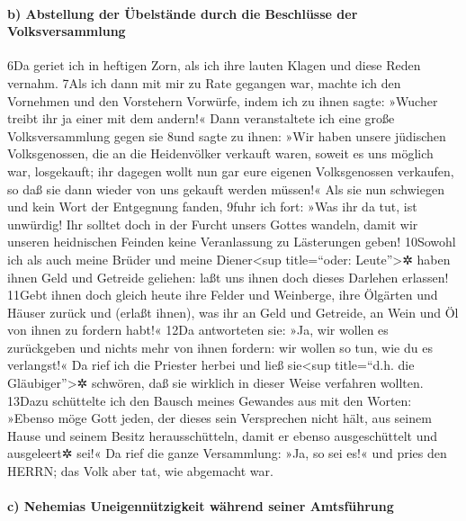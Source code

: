 \hypertarget{b-abstellung-der-uxfcbelstuxe4nde-durch-die-beschluxfcsse-der-volksversammlung}{%
\paragraph{b) Abstellung der Übelstände durch die Beschlüsse der
Volksversammlung}\label{b-abstellung-der-uxfcbelstuxe4nde-durch-die-beschluxfcsse-der-volksversammlung}}

6Da geriet ich in heftigen Zorn, als ich ihre lauten Klagen und diese
Reden vernahm. 7Als ich dann mit mir zu Rate gegangen war, machte ich
den Vornehmen und den Vorstehern Vorwürfe, indem ich zu ihnen sagte:
»Wucher treibt ihr ja einer mit dem andern!« Dann veranstaltete ich eine
große Volksversammlung gegen sie 8und sagte zu ihnen: »Wir haben unsere
jüdischen Volksgenossen, die an die Heidenvölker verkauft waren, soweit
es uns möglich war, losgekauft; ihr dagegen wollt nun gar eure eigenen
Volksgenossen verkaufen, so daß sie dann wieder von uns gekauft werden
müssen!« Als sie nun schwiegen und kein Wort der Entgegnung fanden,
9fuhr ich fort: »Was ihr da tut, ist unwürdig! Ihr solltet doch in der
Furcht unsers Gottes wandeln, damit wir unseren heidnischen Feinden
keine Veranlassung zu Lästerungen geben! 10Sowohl ich als auch meine
Brüder und meine Diener\textless sup title=``oder: Leute''\textgreater✲
haben ihnen Geld und Getreide geliehen: laßt uns ihnen doch dieses
Darlehen erlassen! 11Gebt ihnen doch gleich heute ihre Felder und
Weinberge, ihre Ölgärten und Häuser zurück und (erlaßt ihnen), was ihr
an Geld und Getreide, an Wein und Öl von ihnen zu fordern habt!« 12Da
antworteten sie: »Ja, wir wollen es zurückgeben und nichts mehr von
ihnen fordern: wir wollen so tun, wie du es verlangst!« Da rief ich die
Priester herbei und ließ sie\textless sup title=``d.h. die
Gläubiger''\textgreater✲ schwören, daß sie wirklich in dieser Weise
verfahren wollten. 13Dazu schüttelte ich den Bausch meines Gewandes aus
mit den Worten: »Ebenso möge Gott jeden, der dieses sein Versprechen
nicht hält, aus seinem Hause und seinem Besitz herausschütteln, damit er
ebenso ausgeschüttelt und ausgeleert✲ sei!« Da rief die ganze
Versammlung: »Ja, so sei es!« und pries den HERRN; das Volk aber tat,
wie abgemacht war.

\hypertarget{c-nehemias-uneigennuxfctzigkeit-wuxe4hrend-seiner-amtsfuxfchrung}{%
\paragraph{c) Nehemias Uneigennützigkeit während seiner
Amtsführung}\label{c-nehemias-uneigennuxfctzigkeit-wuxe4hrend-seiner-amtsfuxfchrung}}

